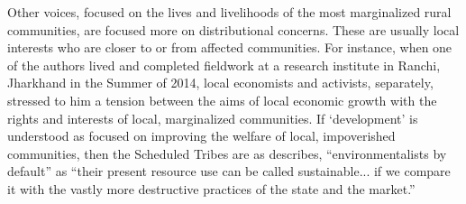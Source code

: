 \documentclass[12pt,reqno]{article}
\begin{document}




Other voices, focused on the lives and livelihoods of the most marginalized rural communities, are focused more on distributional concerns. These are usually local interests who are closer to or from affected communities. For instance, when one of the authors lived and completed fieldwork at a research institute in Ranchi, Jharkhand in the Summer of 2014, local economists and activists, separately, stressed to him a tension between the aims of local economic growth with the rights and interests of local, marginalized communities. If `development' is understood as focused on improving the welfare of local, impoverished communities, then the Scheduled Tribes are as \textcite[239]{baviskar1995belly} describes, ``environmentalists by default'' as ``their present resource use can be called sustainable... if we compare it with the vastly more destructive practices of the state and the market.'' 






\end{document}
